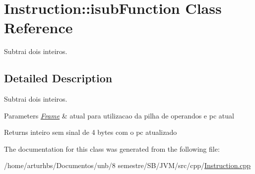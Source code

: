 \hypertarget{classInstruction_1_1isubFunction}{}\section{Instruction\+:\+:isub\+Function Class Reference}
\label{classInstruction_1_1isubFunction}


Subtrai dois inteiros.  




\subsection{Detailed Description}
Subtrai dois inteiros. 


\begin{DoxyParams}{Parameters}
{\em \hyperlink{classFrame}{Frame}} & atual para utilizacao da pilha de operandos e pc atual \\
\hline
\end{DoxyParams}
\begin{DoxyReturn}{Returns}
inteiro sem sinal de 4 bytes com o pc atualizado 
\end{DoxyReturn}


The documentation for this class was generated from the following file\+:\begin{DoxyCompactItemize}
\item 
/home/arturhbs/\+Documentos/unb/8 semestre/\+S\+B/\+J\+V\+M/src/cpp/\hyperlink{Instruction_8cpp}{Instruction.\+cpp}\end{DoxyCompactItemize}
